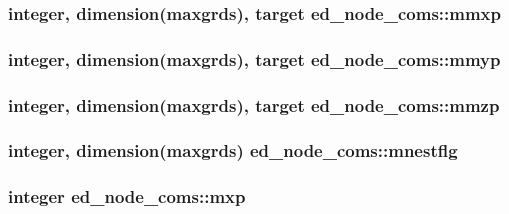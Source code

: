 \subsubsection[{\texorpdfstring{mmxp}{mmxp}}]{\setlength{\rightskip}{0pt plus 5cm}integer, dimension(maxgrds), target ed\+\_\+node\+\_\+coms\+::mmxp}\hypertarget{namespaceed__node__coms_a0a26786e048c93181d52c25d73142af6}{}\label{namespaceed__node__coms_a0a26786e048c93181d52c25d73142af6}
\subsubsection[{\texorpdfstring{mmyp}{mmyp}}]{\setlength{\rightskip}{0pt plus 5cm}integer, dimension(maxgrds), target ed\+\_\+node\+\_\+coms\+::mmyp}\hypertarget{namespaceed__node__coms_a79783fa824eaca254de5ceb5273f1ff2}{}\label{namespaceed__node__coms_a79783fa824eaca254de5ceb5273f1ff2}
\subsubsection[{\texorpdfstring{mmzp}{mmzp}}]{\setlength{\rightskip}{0pt plus 5cm}integer, dimension(maxgrds), target ed\+\_\+node\+\_\+coms\+::mmzp}\hypertarget{namespaceed__node__coms_a9384e8659a53635a2fbec99d3b3ca02f}{}\label{namespaceed__node__coms_a9384e8659a53635a2fbec99d3b3ca02f}
\subsubsection[{\texorpdfstring{mnestflg}{mnestflg}}]{\setlength{\rightskip}{0pt plus 5cm}integer, dimension(maxgrds) ed\+\_\+node\+\_\+coms\+::mnestflg}\hypertarget{namespaceed__node__coms_a9c6d2d73db66ee337e0d7a9b213b05d2}{}\label{namespaceed__node__coms_a9c6d2d73db66ee337e0d7a9b213b05d2}
\subsubsection[{\texorpdfstring{mxp}{mxp}}]{\setlength{\rightskip}{0pt plus 5cm}integer ed\+\_\+node\+\_\+coms\+::mxp}\hypertarget{namespaceed__node__coms_aafd80e646c35b816ee0f00fabe97cc03}{}\label{namespaceed__node__coms_aafd80e646c35b816ee0f00fabe97cc03}

